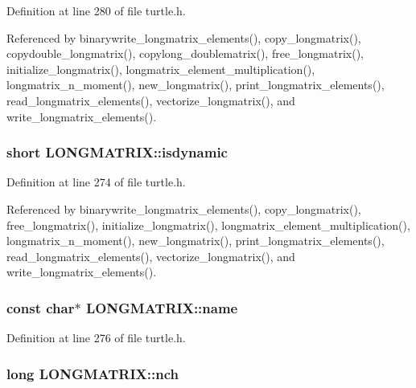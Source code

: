 Definition at line 280 of file turtle.\-h.



Referenced by binarywrite\-\_\-longmatrix\-\_\-elements(), copy\-\_\-longmatrix(), copydouble\-\_\-longmatrix(), copylong\-\_\-doublematrix(), free\-\_\-longmatrix(), initialize\-\_\-longmatrix(), longmatrix\-\_\-element\-\_\-multiplication(), longmatrix\-\_\-n\-\_\-moment(), new\-\_\-longmatrix(), print\-\_\-longmatrix\-\_\-elements(), read\-\_\-longmatrix\-\_\-elements(), vectorize\-\_\-longmatrix(), and write\-\_\-longmatrix\-\_\-elements().

\hypertarget{struct_l_o_n_g_m_a_t_r_i_x_a576a302b56ba47e39c4c2748166195ed}{
\subsubsection[{isdynamic}]{\setlength{\rightskip}{0pt plus 5cm}short L\-O\-N\-G\-M\-A\-T\-R\-I\-X\-::isdynamic}}\label{struct_l_o_n_g_m_a_t_r_i_x_a576a302b56ba47e39c4c2748166195ed}


Definition at line 274 of file turtle.\-h.



Referenced by binarywrite\-\_\-longmatrix\-\_\-elements(), copy\-\_\-longmatrix(), free\-\_\-longmatrix(), initialize\-\_\-longmatrix(), longmatrix\-\_\-element\-\_\-multiplication(), longmatrix\-\_\-n\-\_\-moment(), new\-\_\-longmatrix(), print\-\_\-longmatrix\-\_\-elements(), read\-\_\-longmatrix\-\_\-elements(), vectorize\-\_\-longmatrix(), and write\-\_\-longmatrix\-\_\-elements().

\hypertarget{struct_l_o_n_g_m_a_t_r_i_x_a47b74cf4fed725ea020e245a9cee38bd}{
\subsubsection[{name}]{\setlength{\rightskip}{0pt plus 5cm}const char$\ast$ L\-O\-N\-G\-M\-A\-T\-R\-I\-X\-::name}}\label{struct_l_o_n_g_m_a_t_r_i_x_a47b74cf4fed725ea020e245a9cee38bd}


Definition at line 276 of file turtle.\-h.

\hypertarget{struct_l_o_n_g_m_a_t_r_i_x_a49cdf4afd4a1cc0fa12f54e714de892b}{
\subsubsection[{nch}]{\setlength{\rightskip}{0pt plus 5cm}long L\-O\-N\-G\-M\-A\-T\-R\-I\-X\-::nch}}\label{struct_l_o_n_g_m_a_t_r_i_x_a49cdf4afd4a1cc0fa12f54e714de892b}


